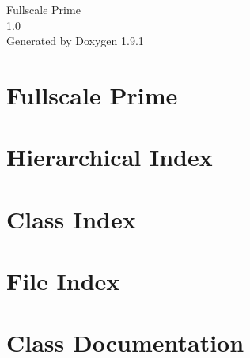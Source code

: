 \let\mypdfximage\pdfximage\def\pdfximage{\immediate\mypdfximage}\documentclass[twoside]{book}
\newcommand{\+}{\discretionary{\mbox{\scriptsize$\hookleftarrow$}}{}{}}
\newcommand{\clearemptydoublepage}{%
  \newpage{\pagestyle{empty}\cleardoublepage}%
}
\begin{document}
\raggedbottom

\hypersetup{pageanchor=false,
             bookmarksnumbered=true,
             pdfencoding=unicode
            }
\begin{titlepage}
\vspace*{7cm}
\begin{center}%
{\Large Fullscale Prime \\[1ex]\large 1.\+0 }\\
\vspace*{1cm}
{\large Generated by Doxygen 1.9.1}\\
\end{center}
\end{titlepage}
\clearemptydoublepage
{}
\tableofcontents
\clearemptydoublepage
{}
\hypersetup{pageanchor=true}

\chapter{Fullscale Prime}
\label{index}\hypertarget{index}{}
\chapter{Hierarchical Index}

\chapter{Class Index}

\chapter{File Index}

\chapter{Class Documentation}



























\end{document}
